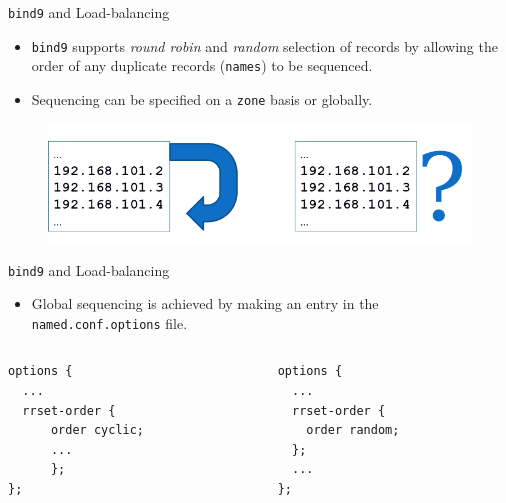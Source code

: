 \documentclass[xcolor=table]{beamer}
\begin{document}
\begin{frame}{\texttt{bind9} and Load-balancing}
  \begin{itemize}
    \item \texttt{bind9} supports \textit{round robin} and \textit{random} selection of records by allowing the order of any duplicate records (\texttt{names}) to be sequenced.
    \item Sequencing can be specified on a \texttt{zone} basis or globally.
  \end{itemize}
  \begin{figure}
    \begin{center}
      \includegraphics[width=1\linewidth]{rrset.png}
    \end{center}
  \end{figure}
\end{frame}

\begin{frame}[fragile]{\texttt{bind9} and Load-balancing}
  \begin{itemize}
    \item Global sequencing is achieved by making an entry in the \texttt{named.conf.options} file.
  \end{itemize}
  \begin{columns}
    \begin{column}{0.5\textwidth}
      \begin{tcolorbox}
        \lstset{
          basicstyle=\scriptsize\ttfamily,
        }
    \begin{lstlisting}
options {
  ...
  rrset-order {
      order cyclic;
      ...
      };
};
    \end{lstlisting}
      \end{tcolorbox}
    \end{column}
    \begin{column}{0.5\textwidth}
      \begin{tcolorbox}
        \lstset{
          basicstyle=\scriptsize\ttfamily,
        }
    \begin{lstlisting}
options {
  ...
  rrset-order {
    order random;
  };
  ...
};
    \end{lstlisting}
      \end{tcolorbox}
    \end{column}
  \end{columns}
\end{frame}
\end{document}
